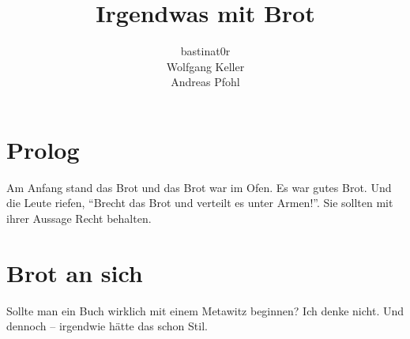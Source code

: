 \documentclass{book}
\title{Irgendwas mit Brot}
\author{bastinat0r \\ Wolfgang Keller \\ Andreas Pfohl}
\begin{document}
\maketitle

\chapter*{Prolog}
Am Anfang stand das Brot und das Brot war im Ofen. Es war gutes Brot. Und die Leute riefen, "`Brecht das Brot und verteilt es unter Armen!"'. Sie sollten mit ihrer Aussage
Recht behalten.

\chapter{Brot an sich}
Sollte man ein Buch wirklich mit einem Metawitz beginnen? Ich denke nicht. Und
dennoch – irgendwie hätte das schon Stil.
\end{document}
